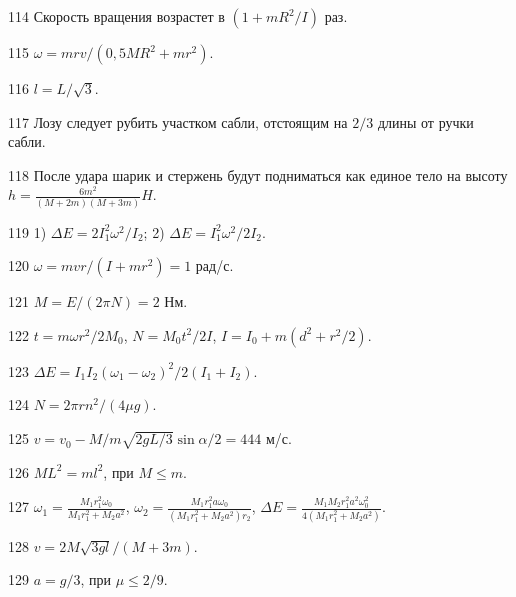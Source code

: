 \begin{Answer}{114}
Скорость вращения возрастет в $(1+mR^2/I)$ раз.
\end{Answer}
\begin{Answer}{115}
$\omega = mrv/(0,5MR^2 + mr^2)$.
\end{Answer}
\begin{Answer}{116}
$l = L/\sqrt{3}$.
\end{Answer}
\begin{Answer}{117}
Лозу следует рубить участком сабли, отстоящим на $2/3$ длины от ручки сабли.
\end{Answer}
\begin{Answer}{118}
После удара шарик и стержень будут подниматься как единое тело на высоту $h = \frac{6m^2}{(M+2m)(M+3m)}H$.
\end{Answer}
\begin{Answer}{119}
1) $\Delta E = 2I_1^2\omega^2/I_2$; 2) $\Delta E = I_1^2\omega^2/2I_2$.
\end{Answer}
\begin{Answer}{120}
$\omega = mvr/(I+mr^2) = 1$ рад/с.
\end{Answer}
\begin{Answer}{121}
$M = E / (2 \pi N) = 2$ Нм.
\end{Answer}
\begin{Answer}{122}
$t = m\omega r^2 / 2M_0$, $N = M_0t^2/2I$, $I = I_0 + m(d^2 + r^2/2)$.
\end{Answer}
\begin{Answer}{123}
$\Delta E = I_1 I_2 (\omega_1 - \omega_2)^2/ 2(I_1 + I_2)$.
\end{Answer}
\begin{Answer}{124}
$N = 2\pi r n^2/(4 \mu g)$.
\end{Answer}
\begin{Answer}{125}
$v = v_0 -M/m \sqrt{2gL/3} \sin \alpha /2 = 444$ м/с.
\end{Answer}
\begin{Answer}{126}
$ML^2 = ml^2$, при $M \leq m$.
\end{Answer}
\begin{Answer}{127}
$\omega_1 = \frac{M_1r_1^2\omega_0}{M_1r_1^2 + M_2a^2}$, $\omega_2 = \frac{M_1r_1^2 a \omega_0}{(M_1r_1^2 + M_2a^2)r_2}$, $\Delta E = \frac{M_1 M_2r_1^2a^2\omega_0^2}{4(M_1r_1^2 + M_2a^2)}$.
\end{Answer}
\begin{Answer}{128}
$v = 2M\sqrt{3gl}/(M+3m)$.
\end{Answer}
\begin{Answer}{129}
$a = g/3$, при $\mu \leq 2/9$.
\end{Answer}
